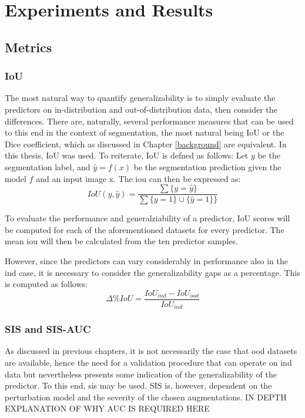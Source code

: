 \chapter{Experiments and Results}\label{experiments}


\section{Metrics}
    \subsection{IoU}
    The most natural way to quantify generalizability is to simply evaluate the predictors on in-distribution and out-of-distribution data, then consider the differences. There are, naturally, several performance measures that can be used to this end in the context of segmentation, the most natural being IoU or the Dice coefficient, which as discussed in Chapter \ref{background} are equivalent. In this thesis, IoU was used. To reiterate, IoU is defned as follows:
    Let \(y\) be the segmentation label, and \(\hat{y}=f(x)\) be the segmentation prediction given the model \(f\) and an input image x. The \gls{iou} can then be expressed as: 
    \begin{equation*}
        IoU(y, \hat{y}) = \frac{\sum \{y=\hat{y}\} }{\sum \{y=1\} \cup \{\hat{y}=1\}\}}
    \end{equation*}
    
    To evaluate the performance and generalziability of a predictor, IoU scores will be computed for each of the aforementioned datasets for every predictor. The mean \gls{iou} will then be calculated from the ten predictor samples. 
    
    However, since the predictors can vary considerably in performance also in the \gls{ind} case, it is necessary to consider the generalizability gaps as a percentage. This is computed as follows:
    \begin{equation}
        \Delta\%IoU = \frac{IoU_{ind}-IoU_{ood}}{IoU_{ind}}
    \end{equation}
    
    \subsection{SIS and SIS-AUC}
    As discussed in previous chapters, it is not necessarily the case that \gls{ood} datasets are available, hence the need for a validation procedure that can operate on \gls{ind} data but nevertheless presents some indication of the generalizability of the predictor. To this end, \gls{sis} may be used. SIS is, however, dependent on the perturbation model and the severity of the chosen augmentations. IN DEPTH EXPLANATION OF WHY AUC IS REQUIRED HERE 

